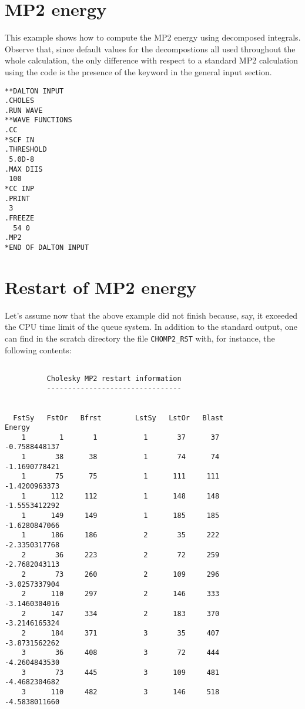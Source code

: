 \section{MP2 energy}
This example shows how to compute the MP2 energy using decomposed integrals. 
Observe that, since default values for the decompostions all used throughout
the whole calculation, the only difference with respect to a standard 
MP2 calculation using the {\cc} code is the presence of the keyword 
 in the  general input section.

\begin{verbatim}
**DALTON INPUT
.CHOLES
.RUN WAVE
**WAVE FUNCTIONS
.CC
*SCF IN
.THRESHOLD
 5.0D-8
.MAX DIIS
 100
*CC INP
.PRINT
 3
.FREEZE
  54 0
.MP2
*END OF DALTON INPUT
\end{verbatim}

\section{Restart of MP2 energy}
Let's assume now that the above example did not finish because, say,
it exceeded the CPU time limit of the queue system. In addition to
the standard output, one can find in the scratch directory the
file \verb|CHOMP2_RST| with, for instance, the following
contents:

\begin{verbatim}

          Cholesky MP2 restart information
          --------------------------------


  FstSy   FstOr   Bfrst        LstSy   LstOr   Blast              Energy
    1        1       1           1       37      37           -0.7588448137
    1       38      38           1       74      74           -1.1690778421
    1       75      75           1      111     111           -1.4200963373
    1      112     112           1      148     148           -1.5553412292
    1      149     149           1      185     185           -1.6280847066
    1      186     186           2       35     222           -2.3350317768
    2       36     223           2       72     259           -2.7682043113
    2       73     260           2      109     296           -3.0257337904
    2      110     297           2      146     333           -3.1460304016
    2      147     334           2      183     370           -3.2146165324
    2      184     371           3       35     407           -3.8731562262
    3       36     408           3       72     444           -4.2604843530
    3       73     445           3      109     481           -4.4682304682
    3      110     482           3      146     518           -4.5838011660
\end{verbatim}

